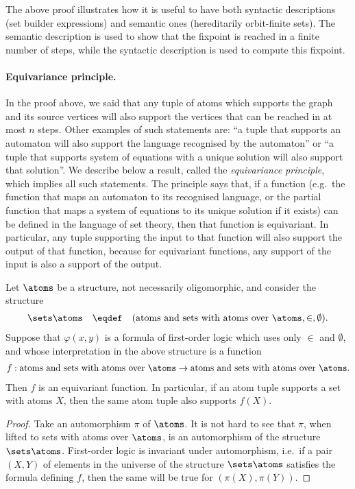 The above proof illustrates how it is useful to have both syntactic descriptions (set builder expressions) and semantic ones (hereditarily orbit-finite sets). The semantic description is used to show that the fixpoint is reached in a finite number of steps, while the syntactic description is used to compute this fixpoint. 


\paragraph*{Equivariance principle.} In the proof above, we said that any tuple of atoms which supports the graph and its source vertices will also support the vertices that can be reached in at most $n$ steps. Other examples of such statements are: ``a tuple that supports an automaton will also support the language recognised by the automaton'' or ``a tuple that supports system of equations with a unique solution will also support that solution''. We describe below a result, called the \emph{equivariance principle}, which implies all such statements. The principle says that, if a function (e.g.~the function that maps an automaton to its recognised language, or the partial function that maps a system of equations to its unique solution if it exists) can be defined in the language of set theory, then that function is equivariant. In particular, any tuple supporting the input to that function will also support the output of that function, because for equivariant functions, any support of the input is also a support of the output.

\begin{lemma}\label{lem:principle-of-equivariance} Let $\atoms$ be a structure, not necessarily oligomorphic, and consider the structure
	\begin{align*}
		\sets \atoms \quad \eqdef \quad (\text{atoms and sets with atoms over $\atoms$}, \in, \emptyset).
	\end{align*}
	Suppose that $\varphi(x,y)$ is a formula of first-order logic which uses only $\in$ and $\emptyset$, and whose interpretation in the above structure is a function
	\begin{align*}
		f : \text{atoms and sets with atoms over $\atoms$} \to \text{atoms and sets with atoms over $\atoms$.}
	\end{align*}
	Then $f$ is an equivariant function. In particular, if an atom tuple supports a set with atoms $X$, then the same atom tuple also supports $f(X)$.
\end{lemma}
\begin{proof}
	Take an automorphism $\pi$ of $\atoms$. It is not hard to see that $\pi$, when lifted to sets with atoms over $\atoms$, is an automorphism of the structure $\sets \atoms$. First-order logic is invariant under automorphism, i.e.~if a pair $(X,Y)$ of elements in the universe of the structure $\sets \atoms$ satisfies the formula defining $f$, then the same will be true for $(\pi(X),\pi(Y))$.
\end{proof}

